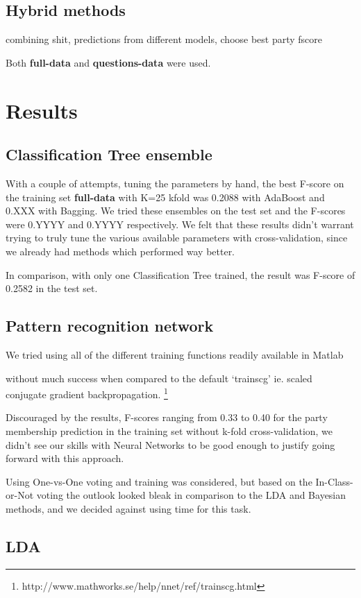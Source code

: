 \documentclass[a4paper,10pt]{article}
\begin{document}
\subsection{Hybrid methods}
combining shit, predictions from different models, choose best party fscore

Both {\bf full-data} and {\bf questions-data} were used.

\section{Results}

\subsection{Classification Tree ensemble}
With a couple of attempts, tuning the parameters by hand, the best F-score on the training set {\bf full-data} with K=25 kfold was 0.2088 with AdaBoost and 0.XXX with Bagging. We tried these ensembles on the test set and the F-scores were 0.YYYY and 0.YYYY respectively. We felt that these results didn’t warrant trying to truly tune the various available parameters with cross-validation, since we already had methods which performed way better.

In comparison, with only one Classification Tree trained, the result was F-score of 0.2582 in the test set.

\subsection{Pattern recognition network}

We tried using all of the different training functions readily available in Matlab

without much success when compared to the default ‘trainscg’ ie. scaled conjugate gradient backpropagation. \footnote{http://www.mathworks.se/help/nnet/ref/trainscg.html}

Discouraged by the results, F-scores ranging from 0.33 to 0.40 for the party membership prediction in the training set without k-fold cross-validation, we didn’t see our skills with Neural Networks to be good enough to justify going forward with this approach.

Using One-vs-One voting and training was considered, but based on the In-Class-or-Not voting the outlook looked bleak in comparison to the LDA and Bayesian methods, and we decided against using time for this task.

\subsection{LDA}
\end{document}
